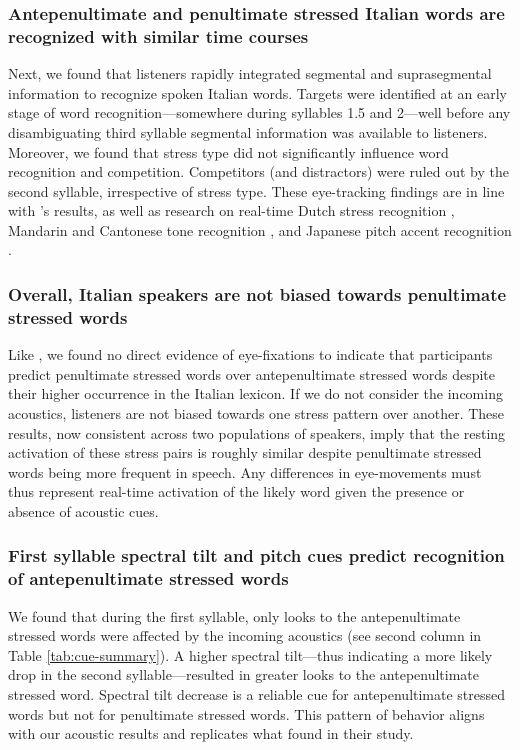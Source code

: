 \subsubsection{Antepenultimate and penultimate stressed Italian words are recognized with similar time courses}
Next, we found that listeners rapidly integrated segmental and suprasegmental information to recognize spoken Italian words. Targets were identified at an early stage of word recognition---somewhere during syllables 1.5 and 2---well before any disambiguating third syllable segmental information was available to listeners. Moreover, we found that stress type did not significantly influence word recognition and competition. Competitors (and distractors) were ruled out by the second syllable, irrespective of stress type. These eye-tracking findings are in line with \cite{Sulpizio_McQueen_2012}'s results, as well as research on real-time Dutch stress recognition \citep{Reinisch2010}, Mandarin and Cantonese tone recognition \citep{zou_2022, qin_2022, Nixon2016}, and Japanese pitch accent recognition \citep{Ito2024}. 

\subsubsection{Overall, Italian speakers are not biased towards penultimate stressed words}
Like \cite{Sulpizio_McQueen_2012}, we found no direct evidence of eye-fixations to indicate that participants predict penultimate stressed words over antepenultimate stressed words despite their higher occurrence in the Italian lexicon. If we do not consider the incoming acoustics, listeners are not biased towards one stress pattern over another. These results, now consistent across two populations of speakers, imply that the resting activation of these stress pairs is roughly similar despite penultimate stressed words being more frequent in speech. Any differences in eye-movements must thus represent real-time activation of the likely word given the presence or absence of acoustic cues.

\subsubsection{First syllable spectral tilt and pitch cues predict recognition of antepenultimate stressed words}
We found that during the first syllable, only looks to the antepenultimate stressed words were affected by the incoming acoustics (see second column in Table \ref{tab:cue-summary}). A higher spectral tilt---thus indicating a more likely drop in the second syllable---resulted in greater looks to the antepenultimate stressed word. Spectral tilt decrease is a reliable cue for antepenultimate stressed words but not for penultimate stressed words. This pattern of behavior aligns with our acoustic results and replicates what \citep{Sulpizio_McQueen_2012} found in their study. 

